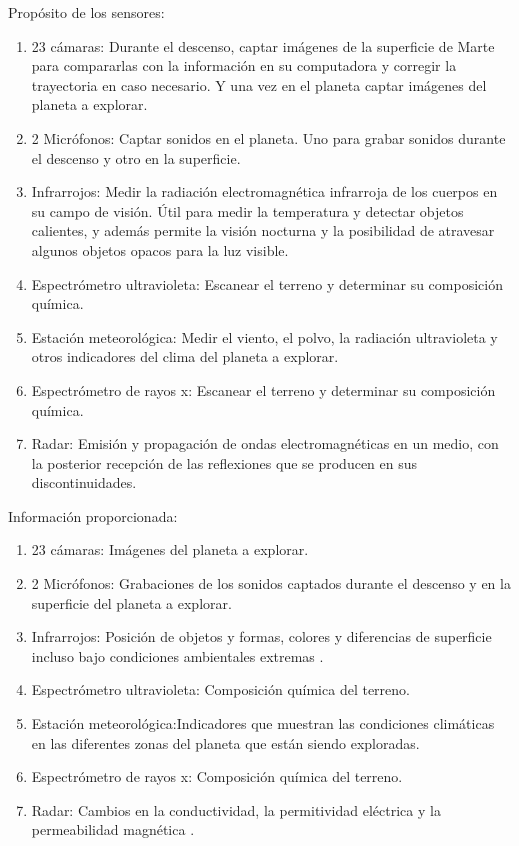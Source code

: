 \documentclass{article}
\begin{document}
        Propósito de los sensores:
        \begin{enumerate}
            \item 23 cámaras: Durante el descenso, captar imágenes de la superficie de Marte para compararlas con la información en su computadora y corregir la trayectoria en caso necesario. Y una vez en el planeta captar imágenes del planeta a explorar.
            \item 2 Micrófonos: Captar sonidos en el planeta. Uno para grabar sonidos durante el descenso y otro en la superficie.
            \item Infrarrojos: Medir la radiación electromagnética infrarroja de los cuerpos en su campo de visión. Útil para medir la temperatura y detectar objetos calientes, y además permite la visión nocturna y la posibilidad de atravesar algunos objetos opacos para la luz visible.
            \item Espectrómetro ultravioleta: Escanear el terreno y determinar su composición química.
            \item Estación meteorológica: Medir el viento, el polvo, la radiación ultravioleta y otros indicadores del clima del planeta a explorar.
            \item Espectrómetro de rayos x: Escanear el terreno y determinar su composición química.
            \item Radar: Emisión y propagación de ondas electromagnéticas en un medio, con la posterior recepción de las reflexiones que se producen en sus discontinuidades.
        \end{enumerate}

        Información proporcionada:
        \begin{enumerate}
            \item 23 cámaras: Imágenes del planeta a explorar.
            \item 2 Micrófonos: Grabaciones de los sonidos captados durante el descenso y en la superficie del planeta a explorar.
            \item Infrarrojos: Posición de objetos y formas, colores y diferencias de superficie incluso bajo condiciones ambientales extremas \parencite{direct-2021}.
            \item Espectrómetro ultravioleta: Composición química del terreno.
            \item Estación meteorológica:Indicadores que muestran las condiciones climáticas en las diferentes zonas del planeta que están siendo exploradas.
            \item Espectrómetro de rayos x: Composición química del terreno.
            \item Radar: Cambios en la conductividad, la permitividad eléctrica y la permeabilidad magnética \parencite{geo-radar-mars}. 
        \end{enumerate}
\end{document}
